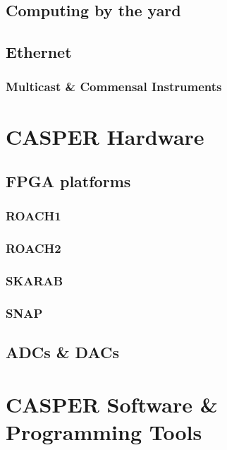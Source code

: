 \documentclass{ws-jai}
\begin{document}

\subsection{Computing by the yard}

\subsection{Ethernet}

\subsubsection{Multicast \& Commensal Instruments}


\section{CASPER Hardware} \label{sec:Hardware}

\subsection{FPGA platforms}

\subsubsection{ROACH1}


\subsubsection{ROACH2}


\subsubsection{SKARAB}


\subsubsection{SNAP}

\subsection{ADCs \& DACs}


\section{CASPER Software \& Programming Tools} \label{sec:Software}
\end{document}

